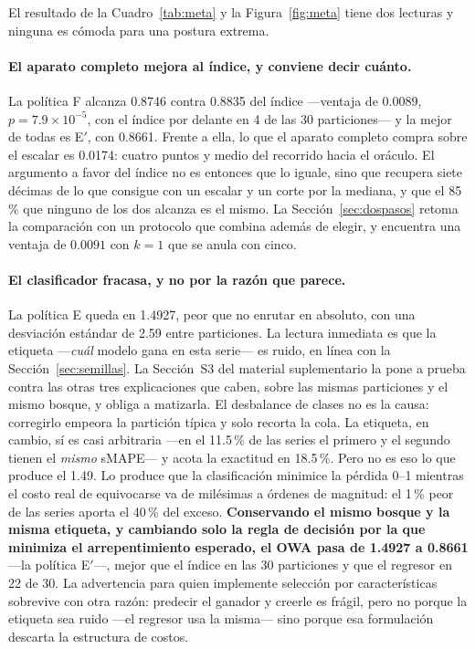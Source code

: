 El resultado de la Cuadro~\ref{tab:meta} y la Figura~\ref{fig:meta} tiene dos lecturas
y ninguna es cómoda para una postura extrema.

\paragraph{El aparato completo mejora al índice, y conviene decir cuánto.} La política F
alcanza 0.8746 contra 0.8835 del índice ---ventaja de 0.0089, $p=7.9\times10^{-5}$, con
el índice por delante en 4 de las 30 particiones--- y la mejor de todas es E$'$, con
0.8661. Frente a ella, lo que el aparato completo compra sobre el escalar es 0.0174:
cuatro puntos y medio del recorrido hacia el oráculo. El argumento a favor del índice no
es entonces que lo iguale, sino que recupera siete décimas de lo que consigue con un
escalar y un corte por la mediana, y que el 85\,\% que ninguno de los dos alcanza es el
mismo. La Sección~\ref{sec:dospasos} retoma la comparación con un protocolo que combina
además de elegir, y encuentra una ventaja de $0.0091$ con $k=1$ que se anula con cinco.

\paragraph{El clasificador fracasa, y no por la razón que parece.} La política E queda en
1.4927, peor que no enrutar en absoluto, con una desviación estándar de 2.59 entre
particiones. La lectura inmediata es que la etiqueta ---\emph{cuál} modelo gana en esta
serie--- es ruido, en línea con la Sección~\ref{sec:semillas}. La Sección~S3 del material
suplementario la pone a prueba contra las otras tres explicaciones que caben, sobre las
mismas particiones y el mismo bosque, y obliga a matizarla. El desbalance de clases no es
la causa: corregirlo empeora la partición típica y solo recorta la cola. La etiqueta, en
cambio, sí es casi arbitraria ---en el 11.5\,\% de las series el primero y el segundo
tienen el \emph{mismo} sMAPE--- y acota la exactitud en 18.5\,\%. Pero no es eso lo que
produce el 1.49. Lo produce que la clasificación minimice la pérdida 0--1 mientras el
costo real de equivocarse va de milésimas a órdenes de magnitud: el 1\,\% peor de las
series aporta el 40\,\% del exceso. \textbf{Conservando el mismo bosque y la misma
etiqueta, y cambiando solo la regla de decisión por la que minimiza el arrepentimiento
esperado, el OWA pasa de 1.4927 a 0.8661} ---la política E$'$---, mejor que el índice en
las 30 particiones y que el regresor en 22 de 30. La advertencia para quien implemente
selección por características sobrevive con otra razón: predecir el ganador y creerle es
frágil, pero no porque la etiqueta sea ruido ---el regresor usa la misma--- sino porque
esa formulación descarta la estructura de costos.


